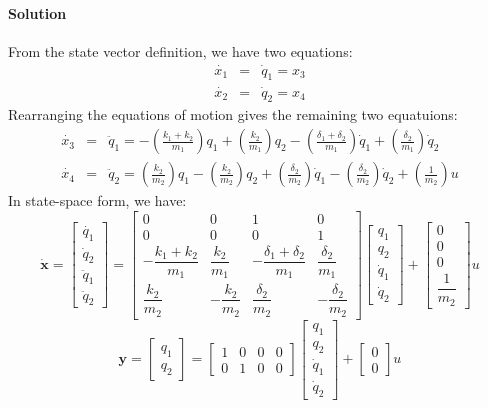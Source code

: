 \documentclass[11pt]{article}
\begin{document}
\paragraph{Solution}
From the state vector definition, we have two equations:
\begin{eqnarray*}
    \dot{x_1} &=& \dot{q}_1 = x_3\\
    \dot{x_2} &=& \dot{q}_2 = x_4
\end{eqnarray*}
Rearranging the equations of motion gives the remaining two equatuions:
\begin{eqnarray*}
    \dot{x_3} &=& \ddot{q}_1 = -\left(\frac{k_1+k_2}{m_1}\right)q_1
    +\left(\frac{k_2}{m_1}\right)q_2
    -\left(\frac{\delta_1+\delta_2}{m_1}\right)\dot{q}_1
    +\left(\frac{\delta_2}{m_1}\right)\dot{q}_2\\
    \dot{x_4} &=& \ddot{q}_2 = \left(\frac{k_2}{m_2}\right)q_1
    -\left(\frac{k_2}{m_2}\right)q_2
    +\left(\frac{\delta_2}{m_2}\right)\dot{q}_1
    -\left(\frac{\delta_2}{m_2}\right)\dot{q}_2
    +\left(\frac{1}{m_2}\right)u
\end{eqnarray*}
In state-space form, we have:
\[
\dot{\mathbf{x}}
=
\begin{bmatrix}
\dot{q_1}\\\dot{q}_2\\\ddot{q}_1\\\ddot{q}_2
\end{bmatrix}
=
\begin{bmatrix}
0 & 0 & 1 & 0 \\
0 & 0 & 0 & 1 \\
-\dfrac{k_1+k_2}{m_1} & \dfrac{k_2}{m_1}
& -\dfrac{\delta_1+\delta_2}{m_1} & \dfrac{\delta_2}{m_1} \\
\dfrac{k_2}{m_2} & -\dfrac{k_2}{m_2}
& \dfrac{\delta_2}{m_2} & -\dfrac{\delta_2}{m_2}
\end{bmatrix}
\begin{bmatrix}
q_1\\q_2\\\dot{q}_1\\\dot{q}_2
\end{bmatrix}
+
\begin{bmatrix}
0 \\
0 \\
0 \\
\dfrac{1}{m_2}
\end{bmatrix}
u
\]
\[
\mathbf{y}=
\begin{bmatrix}
q_1\\q_2
\end{bmatrix}
=
\begin{bmatrix}
1 & 0 & 0 & 0 \\
0 & 1 & 0 & 0
\end{bmatrix}
\begin{bmatrix}
q_1\\q_2\\\dot{q}_1\\\dot{q}_2
\end{bmatrix}
+
\begin{bmatrix}
0 \\
0
\end{bmatrix}
u
\]
\end{document}
